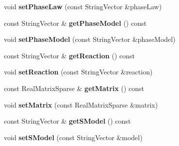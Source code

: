 \begin{DoxyCompactItemize}
\item 
\hypertarget{classGeochemistryParameters_affd3051edc17f64242ab7eb3a476bb75}{
void {\bfseries setPhaseLaw} (const StringVector \&phaseLaw)}
\label{classGeochemistryParameters_affd3051edc17f64242ab7eb3a476bb75}

\item 
\hypertarget{classGeochemistryParameters_aff2a5716e26bf445c2ef41f76a9f8529}{
const StringVector \& {\bfseries getPhaseModel} () const }
\label{classGeochemistryParameters_aff2a5716e26bf445c2ef41f76a9f8529}

\item 
\hypertarget{classGeochemistryParameters_a3138434a1b35ca7a1ec3ab2f5584c59a}{
void {\bfseries setPhaseModel} (const StringVector \&phaseModel)}
\label{classGeochemistryParameters_a3138434a1b35ca7a1ec3ab2f5584c59a}

\item 
\hypertarget{classGeochemistryParameters_ae3b075ec3d81e2769cad8eb80c5c2970}{
const StringVector \& {\bfseries getReaction} () const }
\label{classGeochemistryParameters_ae3b075ec3d81e2769cad8eb80c5c2970}

\item 
\hypertarget{classGeochemistryParameters_a3a53b3df20f8cc51eebec809bc61bc23}{
void {\bfseries setReaction} (const StringVector \&reaction)}
\label{classGeochemistryParameters_a3a53b3df20f8cc51eebec809bc61bc23}

\item 
\hypertarget{classGeochemistryParameters_af788c888d3687a7b3cb2d781eb3223c4}{
const RealMatrixSparse \& {\bfseries getMatrix} () const }
\label{classGeochemistryParameters_af788c888d3687a7b3cb2d781eb3223c4}

\item 
\hypertarget{classGeochemistryParameters_aa1b7ae943f93cc695a9efe3bf31d80c1}{
void {\bfseries setMatrix} (const RealMatrixSparse \&matrix)}
\label{classGeochemistryParameters_aa1b7ae943f93cc695a9efe3bf31d80c1}

\item 
\hypertarget{classGeochemistryParameters_a72f9fdd76ad845d43f224c321d46592e}{
const StringVector \& {\bfseries getSModel} () const }
\label{classGeochemistryParameters_a72f9fdd76ad845d43f224c321d46592e}

\item 
\hypertarget{classGeochemistryParameters_a5598f30c8860f910b30e37824ec63a23}{
void {\bfseries setSModel} (const StringVector \&model)}
\label{classGeochemistryParameters_a5598f30c8860f910b30e37824ec63a23}


\end{DoxyCompactItemize}
